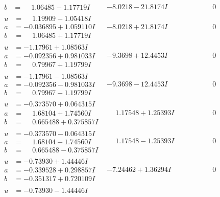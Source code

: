 \documentclass[1p]{elsarticle_modified}
\theoremstyle{definition}
\begin{document}
$$\begin{array}{c|c|c}
\begin{aligned}
b &= \phantom{-}1.06485 - 1.17719 I\end{aligned}
 & -8.0218 - 21.8174 I & \phantom{-0.000000 } 0 \\ \hline\begin{aligned}
u &= \phantom{-}1.19909 - 1.05418 I \\
a &= -0.036895 + 1.059110 I \\
b &= \phantom{-}1.06485 + 1.17719 I\end{aligned}
 & -8.0218 + 21.8174 I & \phantom{-0.000000 } 0 \\ \hline\begin{aligned}
u &= -1.17961 + 1.08563 I \\
a &= -0.092356 + 0.981033 I \\
b &= \phantom{-}0.79967 + 1.19799 I\end{aligned}
 & -9.3698 + 12.4453 I & \phantom{-0.000000 } 0 \\ \hline\begin{aligned}
u &= -1.17961 - 1.08563 I \\
a &= -0.092356 - 0.981033 I \\
b &= \phantom{-}0.79967 - 1.19799 I\end{aligned}
 & -9.3698 - 12.4453 I & \phantom{-0.000000 } 0 \\ \hline\begin{aligned}
u &= -0.373570 + 0.064315 I \\
a &= \phantom{-}1.68104 + 1.74560 I \\
b &= \phantom{-}0.665488 + 0.375857 I\end{aligned}
 & \phantom{-}1.17548 + 1.25393 I & \phantom{-0.000000 } 0 \\ \hline\begin{aligned}
u &= -0.373570 - 0.064315 I \\
a &= \phantom{-}1.68104 - 1.74560 I \\
b &= \phantom{-}0.665488 - 0.375857 I\end{aligned}
 & \phantom{-}1.17548 - 1.25393 I & \phantom{-0.000000 } 0 \\ \hline\begin{aligned}
u &= -0.73930 + 1.44446 I \\
a &= -0.339528 + 0.298857 I \\
b &= -0.351317 + 0.720109 I\end{aligned}
 & -7.24462 + 1.36294 I & \phantom{-0.000000 } 0 \\ \hline\begin{aligned}
u &= -0.73930 - 1.44446 I \\

\end{aligned}
\end{array}$$
\end{document}
